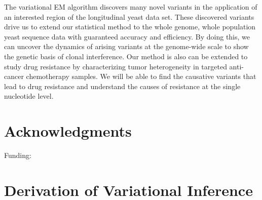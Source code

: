 \documentclass[11pt,reqno]{amsart}
\begin{document}
The variational EM algorithm discovers many novel variants in the application of an interested region of the longitudinal yeast data set.
These discovered variants drive us to extend our statistical method to the whole genome, whole population yeast sequence data with guaranteed accuracy and efficiency.
By doing this, we can uncover the dynamics of arising variants at the genome-wide scale to show the genetic basis of clonal interference.
Our method is also can be extended to study drug resistance by characterizing tumor heterogeneity in targeted anti-cancer chemotherapy samples.
We will be able to find the causative variants that lead to drug resistance and understand the causes of resistance at the single nucleotide level.

\section*{Acknowledgments}
Funding:

\appendix
\section{Derivation of Variational Inference}
\end{document}
